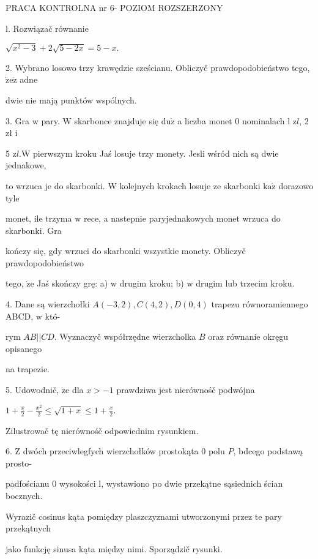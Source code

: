 \documentclass[a4paper,12pt]{article}
\begin{document}
PRACA KONTROLNA nr 6- POZIOM ROZSZERZONY

l. Rozwiązač równanie

$\sqrt{x^{2}-3}+2\sqrt{5-2x}=5-x.$

2. Wybrano losowo trzy krawędzie sześcianu. Obliczyč prawdopodobieństwo tego, $\dot{\mathrm{z}}\mathrm{e}\dot{\mathrm{z}}$ adne

dwie nie mają punktów wspólnych.

3. Gra $\mathrm{w}$ pary. $\mathrm{W}$ skarbonce znajduje się $\mathrm{d}\mathrm{u}\dot{\mathrm{z}}$ a liczba monet $0$ nominalach l $\mathrm{z}l$, 2 zł $\mathrm{i}$

5 $\mathrm{z}l. \mathrm{W}$ pierwszym kroku Jaś losuje trzy monety. Jesli wśród nich są dwie jednakowe,

to wrzuca je do skarbonki. $\mathrm{W}$ kolejnych krokach losuje ze skarbonki $\mathrm{k}\mathrm{a}\dot{\mathrm{z}}$ dorazowo tyle

monet, ile trzyma $\mathrm{w}$ rece, a nastepnie paryjednakowych monet wrzuca do skarbonki. Gra

kończy się, gdy wrzuci do skarbonki wszystkie monety. Obliczyč prawdopodobieństwo

tego, $\dot{\mathrm{z}}\mathrm{e}$ Jaś skończy grę: a) $\mathrm{w}$ drugim kroku; b) $\mathrm{w}$ drugim lub trzecim kroku.

4. Dane są wierzchołki $A(-3,2), C(4,2), D(0,4)$ trapezu równoramiennego ABCD, $\mathrm{w}$ któ-

rym $AB||CD$. Wyznaczyč współrzędne wierzcholka $B$ oraz równanie okręgu opisanego

na trapezie.

5. Udowodnič, $\dot{\mathrm{z}}\mathrm{e}$ dla $x>-1$ prawdziwa jest nierównośč podwójna

$1+\displaystyle \frac{x}{2}-\frac{x^{2}}{2}\leq\sqrt{1+x}\leq 1+\frac{x}{2}.$

Zilustrowač tę nierównośč odpowiednim rysunkiem.

6. $\mathrm{Z}$ dwóch przeciwlegfych wierzchołków prostokąta $0$ polu $P$, bdcego podstawą prosto-

padfościanu $0$ wysokości l, wystawiono po dwie przekątne sąsiednich ścian bocznych.

Wyrazič cosinus kąta pomiędzy plaszczyznami utworzonymi przez te pary przekątnych

jako funkcję sinusa kąta między nimi. Sporządzič rysunki.
\end{document}

